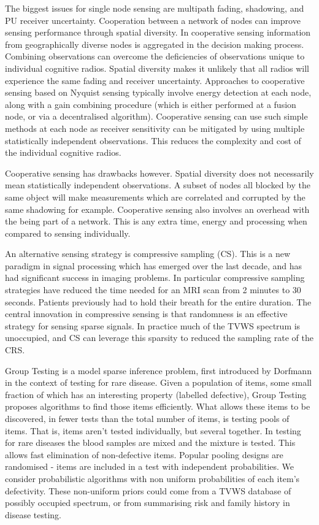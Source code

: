 The biggest issues for single node sensing are multipath fading, shadowing, and PU receiver uncertainty. Cooperation between a network of nodes can improve sensing performance through spatial diversity. In cooperative sensing information from geographically diverse nodes is aggregated in the decision making process. Combining observations can overcome the deficiencies of observations unique to individual cognitive radios. Spatial diversity makes it unlikely that all radios will experience the same fading and receiver uncertainty. Approaches to cooperative sensing based on Nyquist sensing typically involve energy detection at each node, along with a gain combining procedure (which is either performed at a fusion node, or via a decentralised algorithm). Cooperative sensing can use such simple methods at each node as receiver sensitivity can be mitigated by using multiple statistically independent observations. This reduces the complexity and cost of the individual cognitive radios.

Cooperative sensing has drawbacks however. Spatial diversity does not necessarily mean statistically independent observations. A subset of nodes all blocked by the same object will make measurements which are correlated and corrupted by the same shadowing for example. Cooperative sensing also involves an overhead with the being part of a network. This is any extra time, energy and processing when compared to sensing individually. 

An alternative sensing strategy is compressive sampling (CS). This is a new paradigm in signal processing which has emerged over the last decade, and has had significant success in imaging problems. In particular compressive sampling strategies have reduced the time needed for an MRI scan from 2 minutes to 30 seconds. Patients previously had to hold their breath for the entire duration. The central innovation in compressive sensing is that randomness is an effective strategy for sensing sparse signals. In practice much of the TVWS spectrum is unoccupied, and CS can leverage this sparsity to reduced the sampling rate of the CRS.

Group Testing is a model sparse inference problem, first introduced by Dorfmann in the context of testing for rare disease. Given a population of items, some small fraction of which has an interesting property (labelled defective), Group Testing proposes algorithms to find those items efficiently. What allows these items to be discovered, in fewer tests than the total number of items, is testing pools of items. That is, items aren't tested individually, but several together. In testing for rare diseases the blood samples are mixed and the mixture is tested. This allows fast elimination of non-defective items. Popular pooling designs are randomised - items are included in a test with independent probabilities. We consider probabilistic algorithms with non uniform probabilities of each item's defectivity. These non-uniform priors could come from a TVWS database of possibly occupied spectrum, or from summarising risk and family history in disease testing.

